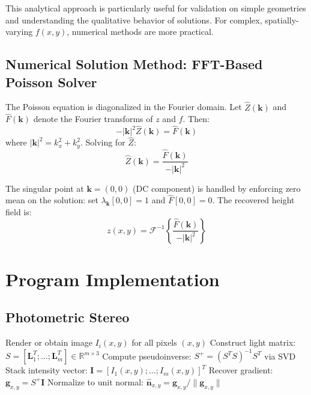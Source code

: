\documentclass[11pt]{article}
\begin{document}
This analytical approach is particularly useful for validation on simple geometries and understanding the qualitative behavior of solutions. For complex, spatially-varying $f(x,y)$, numerical methods are more practical.

\subsection{Numerical Solution Method: FFT-Based Poisson Solver}

The Poisson equation is diagonalized in the Fourier domain. Let $\hat{Z}(\mathbf{k})$ and $\hat{F}(\mathbf{k})$ denote the Fourier transforms of $z$ and $f$. Then:
\begin{equation}
-|\mathbf{k}|^2 \hat{Z}(\mathbf{k}) = \hat{F}(\mathbf{k})
\end{equation}
where $|\mathbf{k}|^2 = k_x^2 + k_y^2$. Solving for $\hat{Z}$:
\begin{equation}
\hat{Z}(\mathbf{k}) = \frac{\hat{F}(\mathbf{k})}{-|\mathbf{k}|^2}
\end{equation}

The singular point at $\mathbf{k} = (0,0)$ (DC component) is handled by enforcing zero mean on the solution: set $\lambda_{\mathbf{k}}[0,0] = 1$ and $\hat{F}[0,0] = 0$. The recovered height field is:
\begin{equation}
z(x,y) = \mathcal{F}^{-1}\left\{\frac{\hat{F}(\mathbf{k})}{-|\mathbf{k}|^2}\right\}
\end{equation}
\newpage
\section{Program Implementation}\label{sec:methods}

\subsection{Photometric Stereo}

\begin{algorithm}
\caption{Photometric Stereo Normal Recovery}
\begin{algorithmic}
\STATE Render or obtain image $I_i(x,y)$ for all pixels $(x,y)$
\ENDFOR
\STATE Construct light matrix: $S = [\mathbf{L}_1^T; \ldots; \mathbf{L}_m^T] \in \mathbb{R}^{m \times 3}$
\STATE Compute pseudoinverse: $S^+ = (S^T S)^{-1} S^T$ via SVD
\STATE Stack intensity vector: $\mathbf{I} = [I_1(x,y); \ldots; I_m(x,y)]^T$
\STATE Recover gradient: $\mathbf{g}_{x,y} = S^+ \mathbf{I}$
\STATE Normalize to unit normal: $\hat{\mathbf{n}}_{x,y} = \mathbf{g}_{x,y} / \|\mathbf{g}_{x,y}\|$
\ENDFOR
\end{algorithmic}
\end{algorithm}
\end{document}
